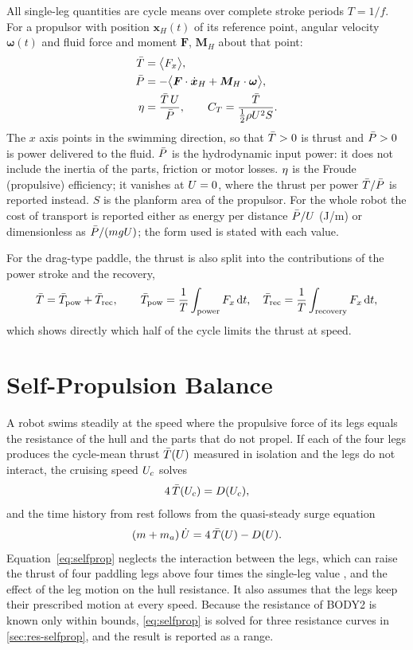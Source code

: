 All single-leg quantities are cycle means over complete stroke periods $T=1/f$. For a propulsor with
position $\bm x_H(t)$ of its reference point, angular velocity $\bm\omega(t)$ and fluid force and moment
$\bm F$, $\bm M_H$ about that point:
\begin{align}
  \bar{T} &= \big\langle F_x \big\rangle, \label{eq:thrust}\\
  \bar{P} &= -\big\langle \bm F\cdot\dot{\bm x}_H + \bm M_H\cdot\bm\omega \big\rangle, \label{eq:power}\\
  \eta &= \frac{\bar{T}\,U}{\bar{P}}, \qquad C_T=\frac{\bar{T}}{\tfrac12\rho U^2S}. \label{eq:eta}
\end{align}
The $x$ axis points in the swimming direction, so that $\bar{T}>0$ is thrust and $\bar{P}>0$ is power delivered
to the fluid. $\bar{P}$ is the hydrodynamic input power: it does not include the inertia of the parts, friction
or motor losses. $\eta$ is the Froude (propulsive) efficiency; it vanishes at $U=0$, where the thrust per
power $\bar{T}/\bar{P}$ is reported instead. $S$ is the planform area of the propulsor. For the whole robot the cost of
transport is reported either as energy per distance $\bar{P}/U$ (J/m) or dimensionless as $\bar{P}/(mgU)$; the
form used is stated with each value.

For the drag-type paddle, the thrust is also split into the contributions of the power stroke and the
recovery,
\begin{equation}
  \bar{T} = \bar{T}_\text{pow} + \bar{T}_\text{rec}, \qquad
  \bar{T}_\text{pow} = \frac1T\int_{\text{power}} F_x\,\mathrm dt, \quad
  \bar{T}_\text{rec} = \frac1T\int_{\text{recovery}} F_x\,\mathrm dt,
  \label{eq:split}
\end{equation}
which shows directly which half of the cycle limits the thrust at speed.

\section{Self-Propulsion Balance}
\label{sec:fund-selfprop}

A robot swims steadily at the speed where the propulsive force of its legs equals the resistance of the
hull and the parts that do not propel. If each of the four legs produces the cycle-mean thrust $\bar{T}(U)$
measured in isolation and the legs do not interact, the cruising speed $U_c$ solves
\begin{equation}
  4\,\bar{T}(U_c) = D(U_c),
  \label{eq:selfprop}
\end{equation}
and the time history from rest follows from the quasi-steady surge equation
\begin{equation}
  (m+m_a)\,\dot{U} = 4\,\bar{T}(U) - D(U).
  \label{eq:surge}
\end{equation}
Equation~\eqref{eq:selfprop} neglects the interaction between the legs, which can raise the thrust of four
paddling legs above four times the single-leg value \cite{Wang2025}, and the effect of the leg motion on the
hull resistance. It also assumes that the legs keep their prescribed motion at every speed. Because the
resistance of BODY2 is known only within bounds, \eqref{eq:selfprop} is solved for three resistance
curves in \cref{sec:res-selfprop}, and the result is reported as a range.
